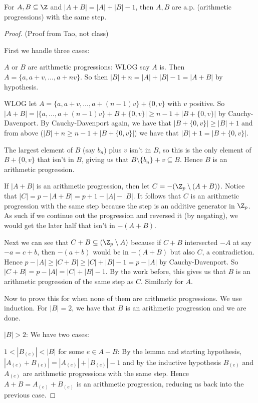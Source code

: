 \documentclass[a4paper]{article}
\begin{document}
\begin{thm}[Vosper]
	For $A,B \subseteq \Z $ and $|A+B| = |A| + |B| - 1 $, then $A,B $ are a.p. (arithmetic progressions) with the same step.
\end{thm}
\begin{proof}
	(Proof from Tao, not class)

	First we handle three cases:

	$A $ or $B $ are arithmetic progressions: WLOG say $A $ is.
	Then $A = \{a, a + v, \ldots , a + nv\}   $.
	So then $|B| + n = |A| + |B| - 1 = |A+B|$ by hypothesis.

	WLOG let $A = \{a, a+v, \ldots , a + (n-1)v\}  + \{0,v\}   $ with $v $ positive.
	So $|A+B| = |\{a, \ldots, a + (n-1)v\}  + B + \{0,v\} | \ge n-1 + |B + \{0,v\} |$ by Cauchy-Davenport.
	By Cauchy-Davenport again, we have that $|B+\{0,v\} | \ge |B| + 1  $ and from above ($|B| + n \ge n-1 + |B+\{0,v\} |  $) we have that $|B| + 1 = |B + \{0,v\} |  $.

	The largest element of $B $ (say $b_n $) plus $v $ isn't in $B $, so this is the only element of $B + \{0,v\}$ that isn't in $B $, giving us that $B \setminus \{b_n\} + v \subseteq B$.
	Hence $B $ is an arithmetic progression.

	If $|A+B| $ is an arithmetic progression, then let $C = -(\Z_p \setminus (A+B)) $.
	Notice that $|C| = p - |A+B| = p + 1 - |A| - |B|$.
	It follows that $C $ is an arithmetic progression with the same step because the step is an additive generator in $\Z_p $.
	As such if we continue out the progression and reversed it (by negating), we would get the later half that isn't in $-(A+B) $.

	Next we can see that $C+B \subseteq (\Z_p \setminus A)$ because if $C+B $ intersected $-A $ at say $-a = c+b $, then $-(a + b)$ would be in $-(A+B) $ but also $C $, a contradiction.
	Hence $p - |A| \ge |C+B| \ge |C|+|B| - 1 = p - |A|$ by Cauchy-Davenport.
	So $|C+B| = p - |A| = |C| + |B| - 1$.
	By the work before, this gives us that $B $ is an arithmetic progression of the same step as $C $.
	Similarly for $A $.

	Now to prove this for when none of them are arithmetic progressions.
	We use induction.
	For $|B| = 2 $, we have that $B $ is an arithmetic progression and we are done.

	$|B| > 2 $:
	We have two cases:

	$1 < |B_{(e)}| < |B|$ for some $e \in A-B $:
	By the lemma and starting hypothesis, $|A_{(e)}+B_{(e)}| = |A_{(e)}| + |B_{(e)}| - 1 $ and by the inductive hypothesis $B_{(e)} $ and $A_{(e)} $ are arithmetic progressions with the same step.
	Hence $A+B = A_{(e)} + B_{(e)}$ is an arithmetic progression, reducing us back into the previous case.


\end{proof}
\end{document}
